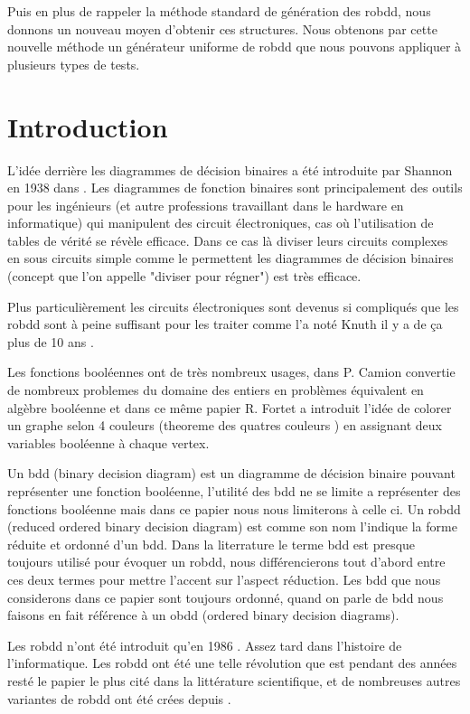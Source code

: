 \documentclass[french]{article}
\begin{document}
Puis en plus de rappeler la méthode standard de génération des robdd, nous donnons un nouveau moyen d'obtenir ces structures. Nous obtenons par cette nouvelle méthode un générateur uniforme de robdd que nous pouvons appliquer à plusieurs types de tests.

\newpage


\section{Introduction}
L'idée derrière les diagrammes de décision binaires a été introduite par Shannon en 1938 dans \cite{shannon}. Les diagrammes de fonction binaires sont principalement des outils pour les ingénieurs (et autre professions travaillant dans le hardware en informatique) qui manipulent des circuit électroniques, cas où l'utilisation de tables de vérité se révèle efficace. Dans ce cas là diviser leurs circuits complexes en sous circuits simple comme le permettent les diagrammes de décision binaires (concept que l'on appelle "diviser pour régner") est très efficace.\medskip

Plus particulièrement les circuits électroniques sont devenus si compliqués que les robdd sont à peine suffisant pour les traiter comme l'a noté Knuth il y a de ça plus de 10 ans \cite{knuth}.\medskip

Les fonctions booléennes ont de très nombreux usages, dans \cite{cahier} P. Camion convertie de nombreux problemes du domaine des entiers en problèmes équivalent en algèbre booléenne et dans ce même papier R. Fortet a introduit l'idée de colorer un graphe selon 4 couleurs (theoreme des quatres couleurs \cite{dirac}) en assignant deux variables booléenne à chaque vertex.\medskip

Un bdd (binary decision diagram) est un diagramme de décision binaire pouvant représenter une fonction booléenne, l'utilité des bdd ne se limite a représenter des fonctions booléenne mais dans ce papier nous nous limiterons à celle ci. Un robdd (reduced ordered binary decision diagram) est comme son nom l'indique la forme réduite et ordonné d'un bdd. Dans la literrature le terme bdd est presque toujours utilisé pour évoquer un robdd, nous différencierons tout d'abord entre ces deux termes pour mettre l'accent sur l'aspect réduction. Les bdd que nous considerons dans ce papier sont toujours ordonné, quand on parle de bdd nous faisons en fait référence à un obdd  (ordered binary decision diagrams).\medskip

Les robdd n'ont été introduit qu'en 1986 \cite{bryant_graph}. Assez tard dans l'histoire de l'informatique. Les robdd ont été une telle révolution que \cite{bryant_graph} est pendant des années resté le papier le plus cité dans la littérature scientifique, et de nombreuses autres variantes de robdd ont été crées depuis \cite{wegner}.\medskip
\end{document}
